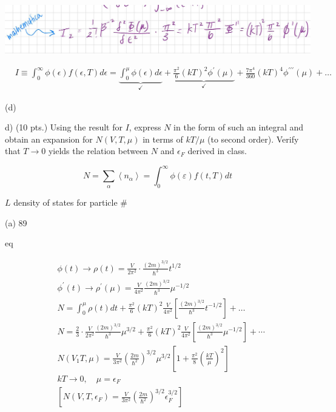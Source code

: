 \documentclass[10pt]{article}
\begin{document}
\begin{center}
\includegraphics[max width=\textwidth]{2024_02_15_8bd07fd17573a85b0312g-09}
\end{center}

$$
\begin{aligned}
& I \equiv \int_{0}^{\infty} \phi(\epsilon) f(\epsilon, T) d \epsilon=\underbrace{\int_{0}^{\mu} \phi(\epsilon) d \epsilon}_{\checkmark}+\underbrace{\frac{\pi^{2}}{6}(k T)^{2} \phi^{\prime}(\mu)}_{\checkmark}+\frac{7 \pi^{4}}{360}(k T)^{4} \phi^{\prime \prime \prime}(\mu)+\ldots
\end{aligned}
$$

(d)

d) (10 pts.) Using the result for $I$, express $N$ in the form of such an integral and obtain an expansion for $N(V, T, \mu)$ in terms of $k T / \mu$ (to second order). Verify that $T \rightarrow 0$ yields the relation between $N$ and $\epsilon_{F}$ derived in class.

$$
N=\sum_{\alpha}\left\langle n_{\alpha}\right\rangle=\int_{0}^{\infty} \phi(\varepsilon) f(t, T) d t
$$

$L$ density of states for particle \#

(a) 89

eq

$$
\begin{aligned}
& \phi(t) \rightarrow \rho(t)=\frac{V}{2 \pi^{2}} \cdot \frac{(2 m)^{3 / 2}}{\hbar^{3}} t^{1 / 2} \\
& \phi^{\prime}(t) \rightarrow \rho^{\prime}(\mu)=\frac{V}{4 \pi^{2}} \frac{(2 m)^{3 / 2}}{\hbar^{3}} \mu^{-1 / 2} \\
& N=\int_{0}^{\mu} \rho(t) d t+\frac{\pi^{2}}{6}(k T)^{2} \frac{V}{4 \pi^{2}}\left[\frac{(2 m)^{3 / 2}}{\hbar^{3}} t^{-1 / 2}\right]+\ldots \\
& N=\frac{2}{3} \cdot \frac{V}{2 \pi^{2}} \frac{(2 m)^{3 / 2}}{\hbar^{3}} \mu^{3 / 2}+\frac{\pi^{2}}{6}(k T)^{2} \frac{V}{4 \pi^{2}}\left[\frac{(2 m)^{3 / 2}}{\hbar^{3}} \mu^{-1 / 2}\right]+\cdots \\
& N\left(V_{1} T, \mu\right)=\frac{V}{3 \pi^{2}}\left(\frac{2 m}{\hbar^{2}}\right)^{3 / 2} \mu^{3 / 2}\left[1+\frac{\pi^{2}}{8}\left(\frac{k T}{\mu}\right)^{2}\right] \\
& k T \rightarrow 0, \quad \mu=\epsilon_{F} \\
& {\left[N\left(V, T, \epsilon_{F}\right)=\frac{V}{3 \pi^{2}}\left(\frac{2 m}{\hbar^{2}}\right)^{3 / 2} \epsilon_{F}^{3 / 2}\right]}
\end{aligned}
$$
\end{document}
